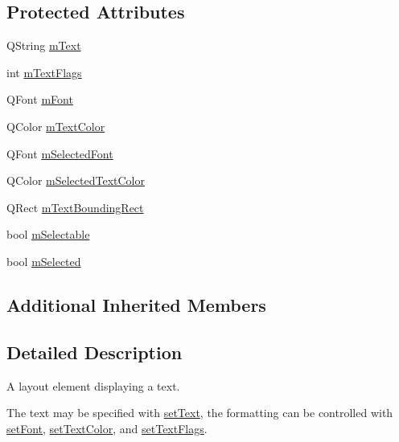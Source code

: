 \subsection*{Protected Attributes}
\begin{DoxyCompactItemize}
\item 
Q\+String \mbox{\hyperlink{class_q_c_p_text_element_a2ef3d8f044b2a0520c90561b3b533028}{m\+Text}}
\item 
int \mbox{\hyperlink{class_q_c_p_text_element_a221eb95ecda1056eb79d56f1230f45d5}{m\+Text\+Flags}}
\item 
Q\+Font \mbox{\hyperlink{class_q_c_p_text_element_a2fef52fa1ec006799102b2956133ba29}{m\+Font}}
\item 
Q\+Color \mbox{\hyperlink{class_q_c_p_text_element_a3685263a99eacd98b180d29adc8e8830}{m\+Text\+Color}}
\item 
Q\+Font \mbox{\hyperlink{class_q_c_p_text_element_a5d242628c9c4beb361b82676c4851c38}{m\+Selected\+Font}}
\item 
Q\+Color \mbox{\hyperlink{class_q_c_p_text_element_ad523a852d47bc97b1af62a4d0dedf2ad}{m\+Selected\+Text\+Color}}
\item 
Q\+Rect \mbox{\hyperlink{class_q_c_p_text_element_a226bb09aae41b1d106f6b00d52def0cb}{m\+Text\+Bounding\+Rect}}
\item 
bool \mbox{\hyperlink{class_q_c_p_text_element_a112e8f9898991fe54f94fcb7effddc2f}{m\+Selectable}}
\item 
bool \mbox{\hyperlink{class_q_c_p_text_element_a7a46eb67459a3c8c80d19aa28b8ae791}{m\+Selected}}
\end{DoxyCompactItemize}
\subsection*{Additional Inherited Members}


\subsection{Detailed Description}
A layout element displaying a text. 

The text may be specified with \mbox{\hyperlink{class_q_c_p_text_element_ac44b81e69e719b879eb2feecb33557e2}{set\+Text}}, the formatting can be controlled with \mbox{\hyperlink{class_q_c_p_text_element_a09b3241769528fa87cb4bf35c97defad}{set\+Font}}, \mbox{\hyperlink{class_q_c_p_text_element_a4f3b8361c3ffb3f84346954929ce93ba}{set\+Text\+Color}}, and \mbox{\hyperlink{class_q_c_p_text_element_ab908f437f552020888a3ad8cf8242605}{set\+Text\+Flags}}.


